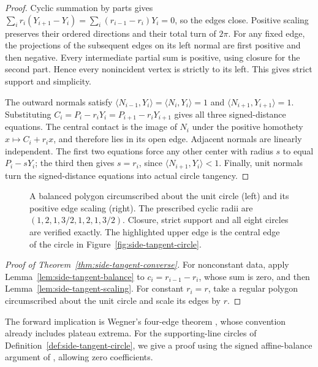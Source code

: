 \begin{proof}
Cyclic summation by parts gives
$\sum_i r_i(Y_{i+1}-Y_i)=\sum_i(r_{i-1}-r_i)Y_i=0$, so the edges close.
Positive scaling preserves their ordered directions and their total turn
of $2\pi$. For any fixed edge, the projections of the subsequent edges on
its left normal are first positive and then negative. Every intermediate
partial sum is positive, using closure for the second part. Hence every
nonincident vertex is strictly to its left. This gives strict support and
simplicity.

The outward normals satisfy
$\langle N_{i-1},Y_i\rangle=\langle N_i,Y_i\rangle=1$ and
$\langle N_{i+1},Y_{i+1}\rangle=1$. Substituting
$C_i=P_i-r_iY_i=P_{i+1}-r_iY_{i+1}$ gives all three
signed-distance equations. The central contact is the image of $N_i$ under
the positive homothety $x\mapsto C_i+r_ix$, and therefore lies in its open
edge. Adjacent normals are linearly independent. The first two equations
force any other center with radius $s$ to equal $P_i-sY_i$; the third then
gives $s=r_i$, since $\langle N_{i+1},Y_i\rangle<1$. Finally, unit normals
turn the signed-distance equations into actual circle tangency.
\end{proof}

\begin{figure}[tb]
\centering
{}
\caption{A balanced polygon circumscribed about the unit circle (left) and
its positive edge scaling (right). The prescribed cyclic radii are
$(1,2,1,3/2,1,2,1,3/2)$. Closure, strict support and all eight circles are
verified exactly. The highlighted upper edge is the central edge of the
circle in Figure~\ref{fig:side-tangent-circle}.}
\label{fig:side-tangent-construction}
\end{figure}

\begin{proof}[Proof of Theorem~\ref{thm:side-tangent-converse}]
For nonconstant data, apply Lemma~\ref{lem:side-tangent-balance} to
$c_i=r_{i-1}-r_i$, whose sum is zero, and then
Lemma~\ref{lem:side-tangent-scaling}. For constant $r_i=r$, take a regular
polygon circumscribed about the unit circle and scale its edges by $r$.
\end{proof}

The forward implication is Wegner's four-edge theorem
\cite[Theorem~1]{Wegner1994}, whose convention already includes plateau
extrema. For the supporting-line circles of
Definition~\ref{def:side-tangent-circle}, we give a proof using the signed
affine-balance argument of \cite[Theorem~21.15]{Pak2010}, allowing zero
coefficients.

